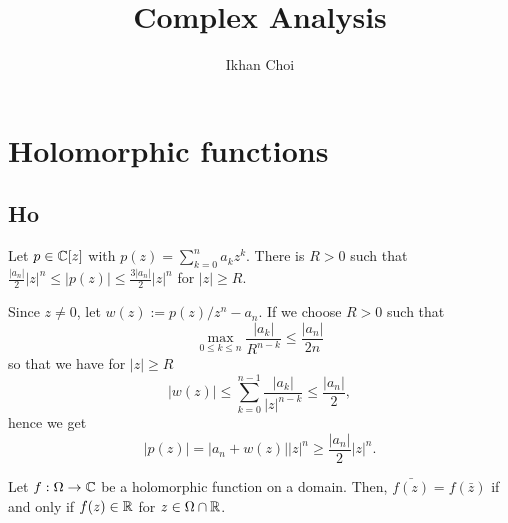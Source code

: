 \documentclass{../note}
\begin{document}
\title{Complex Analysis}
\author{Ikhan Choi}
\maketitle
\tableofcontents



\chapter{Holomorphic functions}

\section{Ho}

\begin{prb}
Let $p\in\mathbb{C}[z]$ with $p(z)=\sum_{k=0}^na_kz^k$.
There is $R>0$ such that $\frac{|a_n|}2|z|^n\le|p(z)|\le\frac{3|a_n|}2|z|^n$ for $|z|\ge R$.
\end{prb}
\begin{pf}
Since $z\ne0$, let $w(z):=p(z)/z^n-a_n$.
If we choose $R>0$ such that
\[\max_{0\le k\le n}\frac{|a_k|}{R^{n-k}}\le\frac{|a_n|}{2n}\]
so that we have for $|z|\ge R$
\[|w(z)|\le\sum_{k=0}^{n-1}\frac{|a_k|}{|z|^{n-k}}\le\frac{|a_n|}2,\]
hence we get
\[|p(z)|=|a_n+w(z)||z|^n\ge\frac{|a_n|}2|z|^n.\]
\end{pf}

\begin{prb}
Let $f:\Omega\to\mathbb{C}$ be a holomorphic function on a domain.
Then, $\bar{f(z)}=f(\bar z)$ if and only if $f(z)\in\mathbb{R}$ for $z\in\Omega\cap\mathbb{R}$.
\end{prb}
\end{document}
